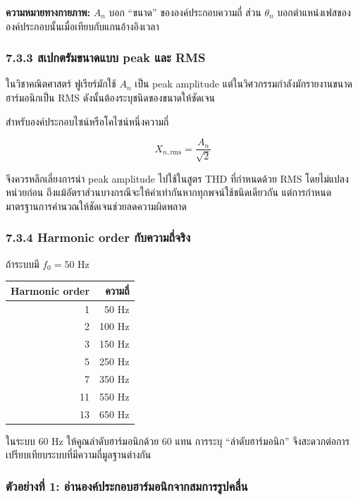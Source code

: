 \textbf{ความหมายทางกายภาพ:} $A_n$ บอก “ขนาด” ขององค์ประกอบความถี่ ส่วน $\theta_n$ บอกตำแหน่งเฟสขององค์ประกอบนั้นเมื่อเทียบกับแกนอ้างอิงเวลา

\subsubsection{7.3.3 สเปกตรัมขนาดแบบ peak และ RMS}

ในวิชาคณิตศาสตร์ ฟูเรียร์มักใช้ $A_n$ เป็น peak amplitude แต่ในวิศวกรรมกำลังมักรายงานขนาดฮาร์มอนิกเป็น RMS ดังนั้นต้องระบุชนิดของขนาดให้ชัดเจน

สำหรับองค์ประกอบไซน์หรือโคไซน์หนึ่งความถี่

\[
X_{n,\mathrm{rms}}=\frac{A_n}{\sqrt{2}}
\]

จึงควรหลีกเลี่ยงการนำ peak amplitude ไปใช้ในสูตร THD ที่กำหนดด้วย RMS โดยไม่แปลงหน่วยก่อน ถึงแม้อัตราส่วนบางกรณีจะให้ค่าเท่ากันหากทุกพจน์ใช้ชนิดเดียวกัน แต่การกำหนดมาตรฐานการคำนวณให้ชัดเจนช่วยลดความผิดพลาด

\subsubsection{7.3.4 Harmonic order กับความถี่จริง}

ถ้าระบบมี $f_0=50$ Hz

\begin{table}[htbp]
    \centering
    \begin{tabular}{r r}
        \hline
        \textbf{Harmonic order} & \textbf{ความถี่} \\
        \hline
        1 & 50 Hz \\
        2 & 100 Hz \\
        3 & 150 Hz \\
        5 & 250 Hz \\
        7 & 350 Hz \\
        11 & 550 Hz \\
        13 & 650 Hz \\
        \hline
    \end{tabular}
\end{table}

ในระบบ 60 Hz ให้คูณลำดับฮาร์มอนิกด้วย 60 แทน การระบุ “ลำดับฮาร์มอนิก” จึงสะดวกต่อการเปรียบเทียบระบบที่มีความถี่มูลฐานต่างกัน

\subsubsection{ตัวอย่างที่ 1: อ่านองค์ประกอบฮาร์มอนิกจากสมการรูปคลื่น}

